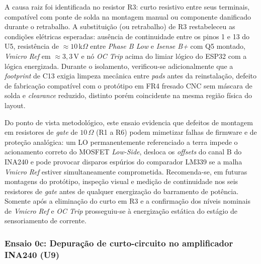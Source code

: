 A causa raiz foi identificada no resistor R3: curto resistivo entre seus terminais, compatível com ponte de solda na montagem manual ou componente danificado durante o retrabalho. A substituição (ou retrabalho) de R3 restabeleceu as condições elétricas esperadas: ausência de continuidade entre os pinos 1 e 13 do U5, resistência de $\approx 10\,\text{k}\Omega$ entre \textit{Phase B Low} e \textit{Isense B+} com Q5 montado, \textit{Vmicro Ref} em $\approx 3{,}3\,\text{V}$ e nó \textit{OC Trip} acima do limiar lógico do ESP32 com a lógica energizada. Durante o isolamento, verificou-se adicionalmente que a \textit{footprint} de C13 exigia limpeza mecânica entre \textit{pads} antes da reinstalação, defeito de fabricação compatível com o protótipo em FR4 fresado CNC sem máscara de solda e \textit{clearance} reduzido, distinto porém coincidente na mesma região física do layout.

Do ponto de vista metodológico, este ensaio evidencia que defeitos de montagem em resistores de \textit{gate} de $10\,\Omega$ (R1 a R6) podem mimetizar falhas de firmware e de proteção analógica: um LO permanentemente referenciado a terra impede o acionamento correto do MOSFET \textit{Low-Side}, desloca os \textit{offsets} do canal B do INA240 e pode provocar disparos espúrios do comparador LM339 se a malha \textit{Vmicro Ref} estiver simultaneamente comprometida. Recomenda-se, em futuras montagens do protótipo, inspeção visual e medição de continuidade nos seis resistores de \textit{gate} antes de qualquer energização do barramento de potência. Somente após a eliminação do curto em R3 e a confirmação dos níveis nominais de \textit{Vmicro Ref} e \textit{OC Trip} prosseguiu-se à energização estática do estágio de sensoriamento de corrente.

\subsubsection{Ensaio 0c: Depuração de curto-circuito no amplificador INA240 (U9)}
\label{subsubsec:ensaio0c_curto_ina240_u9}

